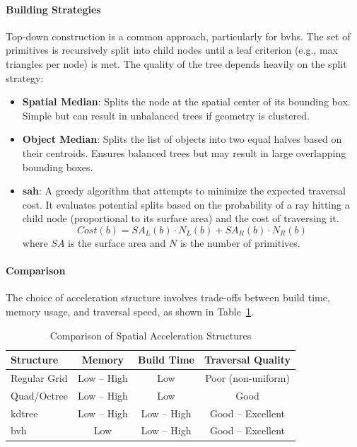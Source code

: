 \paragraph{Building Strategies}\label{par:building-strategies}

Top-down construction is a common approach, particularly for \glspl{bvh}.
The set of primitives is recursively split into child nodes
until a leaf criterion (e.g., max triangles per node) is met.
The quality of the tree depends heavily on the split strategy:

\begin{itemize}
    \item \textbf{Spatial Median}:
        Splits the node at the spatial center of its bounding box.
        Simple but can result in unbalanced trees if geometry is clustered.
    \item \textbf{Object Median}:
        Splits the list of objects into two equal halves based on their centroids.
        Ensures balanced trees but may result in large overlapping bounding boxes.
    \item \textbf{\gls{sah}}:
        A greedy algorithm that attempts to minimize the expected traversal cost.
        It evaluates potential splits based on the probability of a ray hitting a child node
        (proportional to its surface area) and the cost of traversing it.
        \[
        Cost(b) = SA_L(b) \cdot N_L(b) + SA_R(b) \cdot N_R(b)
        \]
        where $SA$ is the surface area and $N$ is the number of primitives.
\end{itemize}

\paragraph{Comparison}\label{par:comparison}

The choice of acceleration structure involves trade-offs between build time, memory usage, and traversal speed,
as shown in Table~\ref{tab:comparison-of-as}.

\begin{table}[h]
    \centering
    \caption{Comparison of Spatial Acceleration Structures\cite{tuwien_rendering_2020}}
    \label{tab:comparison-of-as}
    \begin{tabular}{lccc}
        \toprule
        \textbf{Structure} & \textbf{Memory} & \textbf{Build Time} & \textbf{Traversal Quality} \\
        \midrule
        Regular Grid & Low -- High & Low & Poor (non-uniform) \\
        Quad/Octree & Low -- High & Low & Good \\
        \gls{kdtree} & Low -- High & Low -- High & Good -- Excellent \\
        \gls{bvh} & Low & Low -- High & Good -- Excellent \\
        \bottomrule
    \end{tabular}
\end{table}

